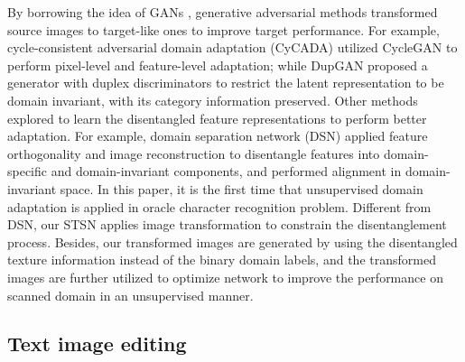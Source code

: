 \documentclass[10pt,journal,compsoc,twocolumn ]{IEEEtran}
\begin{document}
By borrowing the idea of GANs \cite{goodfellow2014generative}, generative adversarial methods \cite{hoffman2018cycada,hu2018duplex,sankaranarayanan2018generate} transformed source images to target-like ones to improve target performance. For example, cycle-consistent adversarial domain adaptation (CyCADA)  \cite{hoffman2018cycada} utilized CycleGAN \cite{zhu2017unpaired} to perform pixel-level and feature-level adaptation; while DupGAN \cite{hu2018duplex}  proposed a generator with duplex discriminators to restrict the latent representation to be domain invariant, with its category information preserved. Other methods \cite{bousmalis2016domain,zhang2018collaborative} explored to learn the disentangled feature representations to perform better adaptation. For example, domain separation network (DSN) \cite{bousmalis2016domain} applied feature orthogonality and image reconstruction to disentangle features into domain-specific and domain-invariant components, and performed alignment in domain-invariant space. In this paper, it is the first time that unsupervised domain adaptation is applied in oracle character recognition problem. Different from DSN, our STSN applies image transformation to constrain the disentanglement process. Besides, our transformed images are generated by using the disentangled texture information instead of the binary domain labels, and the transformed images are further utilized to optimize network to improve the performance on scanned domain in an unsupervised manner. %

\subsection{Text image editing}
\end{document}

